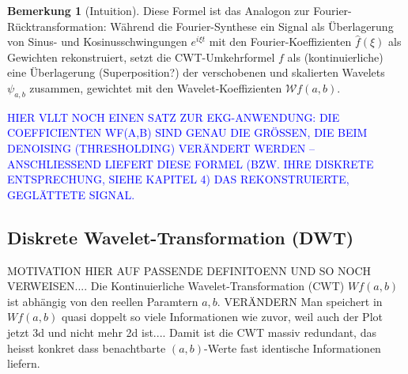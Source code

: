 \documentclass[a4paper,11pt,bibliography=totoc,listof=totoc,headinclude=true,cleardoublepage=empty,oneside]{scrbook}
\theoremstyle{definition}
\newtheorem{bemerkung}[theorem]{Bemerkung}
\theoremstyle{remark}
\begin{document}
  \begin{bemerkung}[Intuition]
   Diese Formel ist das Analogon zur Fourier-Rücktransformation: Während die
   Fourier-Synthese ein Signal als Überlagerung von Sinus- und Kosinusschwingungen
   $e^{i\xi t}$ mit den Fourier-Koeffizienten $\hat f(\xi)$ als Gewichten
   rekonstruiert, setzt die CWT-Umkehrformel $f$ als (kontinuierliche) eine Überlagerung (Superposition?)
   der verschobenen und skalierten Wavelets $\psi_{a,b}$ zusammen, gewichtet mit den
   Wavelet-Koeffizienten $\mathcal{W}f(a,b)$.
   
   \textcolor{blue}{HIER VLLT NOCH EINEN SATZ ZUR EKG-ANWENDUNG: DIE COEFFICIENTEN
   WF(A,B) SIND GENAU DIE GRÖSSEN, DIE BEIM DENOISING (THRESHOLDING) VERÄNDERT
   WERDEN -- ANSCHLIESSEND LIEFERT DIESE FORMEL (BZW. IHRE DISKRETE ENTSPRECHUNG,
   SIEHE KAPITEL 4) DAS REKONSTRUIERTE, GEGLÄTTETE SIGNAL.}
  \end{bemerkung}
  


  

  \subsection{Diskrete Wavelet-Transformation (DWT)}

  MOTIVATION 
  HIER AUF PASSENDE DEFINITOENN UND SO NOCH VERWEISEN....
  Die Kontinuierliche Wavelet-Transformation (CWT) $Wf(a,b)$ ist abhängig von den reellen Paramtern $a,b$.
  VERÄNDERN Man speichert in $Wf(a,b)$ quasi doppelt so viele Informationen wie zuvor, weil auch der Plot jetzt 3d und nicht mehr 2d ist....
  Damit ist die CWT massiv redundant, das heisst konkret dass benachtbarte $(a,b)$-Werte fast identische Informationen liefern. 
\end{document}
